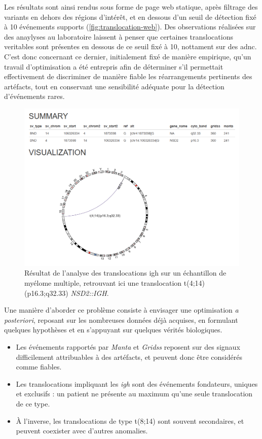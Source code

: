 \vspace{1em}

Les résultats sont ainsi rendus sous forme de page web statique, après filtrage des variants en dehors des régions d'intérêt, et en dessous d'un seuil 
de détection fixé à 10 événements supports (\autoref{fig:translocation-web}). Des observations réalisées sur des anaylyses au laboratoire 
laissent à penser que certaines translocations veritables sont présentes en dessous de ce seuil fixé à 10, nottament sur des \gls{adnc}.
C'est donc concernant ce dernier, initialement fixé de manière empirique, qu'un travail d'optimisation a été entrepris afin de déterminer 
s'il permettait effectivement de discriminer de manière fiable les réarrangements pertinents des artéfacts, tout en conservant une sensibilité adéquate 
pour la détection d'événements rares. 

\begin{figure}[H]
    \centering
    \includegraphics[width=1\textwidth]{images/translocation_web.png}
    \caption{
        Résultat de l'analyse des translocations \gls{igh} sur un échantillon de myélome multiple, 
        retrouvant ici une translocation t(4;14)(p16.3;q32.33) \textit{NSD2::IGH}.
        }
    \label{fig:translocation-web}
\end{figure}

Une manière d'aborder ce problème consiste à envisager une optimisation \textit{a posteriori}, reposant sur les nombreuses données déjà acquises, 
en formulant quelques hypothèses et en s'appuyant sur quelques vérités biologiques.

\begin{itemize}
    \item Les événements rapportés par \textit{Manta} et \textit{Gridss} reposent sur des signaux difficilement attribuables à des artéfacts, et peuvent donc être considérés comme fiables.
    \item Les translocations impliquant les \textit{\gls{igh}} sont des événements fondateurs, uniques et exclusifs : un patient ne présente au maximum qu'une seule translocation de ce type.
    \item À l'inverse, les translocations de type t(8;14) sont souvent secondaires, et peuvent coexister avec d'autres anomalies.
\end{itemize}

